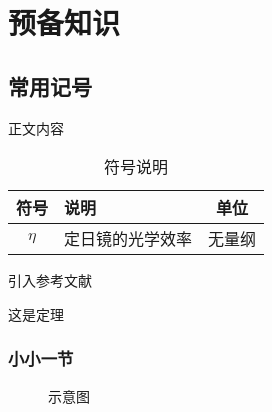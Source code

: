 \documentclass[UTF8,heading=true,12pt]{article}
\begin{document}
	\section{预备知识}
	\subsection{常用记号}
	正文内容
	\begin{table}[H]
		\centering\small
		\renewcommand{\arraystretch}{1.5} %
		\caption{符号说明}
		\begin{tabular}{clc} %
			\hline
			\textbf{符号} & \textbf{说明} & \textbf{单位} \\ \hline
			$\eta$ & 定日镜的光学效率 & 无量纲\\
			\hline
		\end{tabular}
	\end{table}  
	引入参考文献 \cite{bazlov2024momentsrepresentationnumbers}
	\begin{theorem}
		这是定理
	\end{theorem}
	
	\subsubsection{小小一节}
	\begin{figure}[H]
		\centering
		\hfill
		\hfill
		\hfill
		\caption{示意图}
		\label{fig:label2}
	\end{figure}  
	
	
	
	
\end{document}
